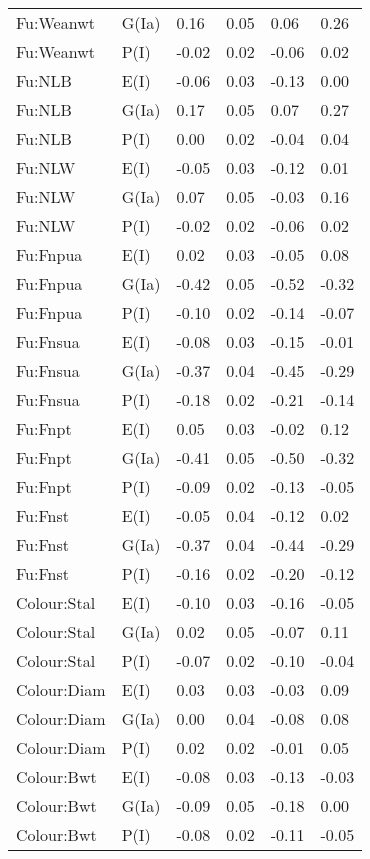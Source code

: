 \begin{center}
\begin{longtable}{|p{1.1in}|p{0.7in}|p{0.7in}|p{0.6in}|p{0.6in}|p{0.6in}|}
  Fu:Weanwt & G(Ia) & 0.16 & 0.05 & 0.06 & 0.26 \\ 
  Fu:Weanwt & P(I) & -0.02 & 0.02 & -0.06 & 0.02 \\ 
  Fu:NLB & E(I) & -0.06 & 0.03 & -0.13 & 0.00 \\ 
  Fu:NLB & G(Ia) & 0.17 & 0.05 & 0.07 & 0.27 \\ 
  Fu:NLB & P(I) & 0.00 & 0.02 & -0.04 & 0.04 \\ 
  Fu:NLW & E(I) & -0.05 & 0.03 & -0.12 & 0.01 \\ 
  Fu:NLW & G(Ia) & 0.07 & 0.05 & -0.03 & 0.16 \\ 
  Fu:NLW & P(I) & -0.02 & 0.02 & -0.06 & 0.02 \\ 
  Fu:Fnpua & E(I) & 0.02 & 0.03 & -0.05 & 0.08 \\ 
  Fu:Fnpua & G(Ia) & -0.42 & 0.05 & -0.52 & -0.32 \\ 
  Fu:Fnpua & P(I) & -0.10 & 0.02 & -0.14 & -0.07 \\ 
  Fu:Fnsua & E(I) & -0.08 & 0.03 & -0.15 & -0.01 \\ 
  Fu:Fnsua & G(Ia) & -0.37 & 0.04 & -0.45 & -0.29 \\ 
  Fu:Fnsua & P(I) & -0.18 & 0.02 & -0.21 & -0.14 \\ 
  Fu:Fnpt & E(I) & 0.05 & 0.03 & -0.02 & 0.12 \\ 
  Fu:Fnpt & G(Ia) & -0.41 & 0.05 & -0.50 & -0.32 \\ 
  Fu:Fnpt & P(I) & -0.09 & 0.02 & -0.13 & -0.05 \\ 
  Fu:Fnst & E(I) & -0.05 & 0.04 & -0.12 & 0.02 \\ 
  Fu:Fnst & G(Ia) & -0.37 & 0.04 & -0.44 & -0.29 \\ 
  Fu:Fnst & P(I) & -0.16 & 0.02 & -0.20 & -0.12 \\ 
  Colour:Stal & E(I) & -0.10 & 0.03 & -0.16 & -0.05 \\ 
  Colour:Stal & G(Ia) & 0.02 & 0.05 & -0.07 & 0.11 \\ 
  Colour:Stal & P(I) & -0.07 & 0.02 & -0.10 & -0.04 \\ 
  Colour:Diam & E(I) & 0.03 & 0.03 & -0.03 & 0.09 \\ 
  Colour:Diam & G(Ia) & 0.00 & 0.04 & -0.08 & 0.08 \\ 
  Colour:Diam & P(I) & 0.02 & 0.02 & -0.01 & 0.05 \\ 
  Colour:Bwt & E(I) & -0.08 & 0.03 & -0.13 & -0.03 \\ 
  Colour:Bwt & G(Ia) & -0.09 & 0.05 & -0.18 & 0.00 \\ 
  Colour:Bwt & P(I) & -0.08 & 0.02 & -0.11 & -0.05 \\ 

\end{longtable}
\end{center}

